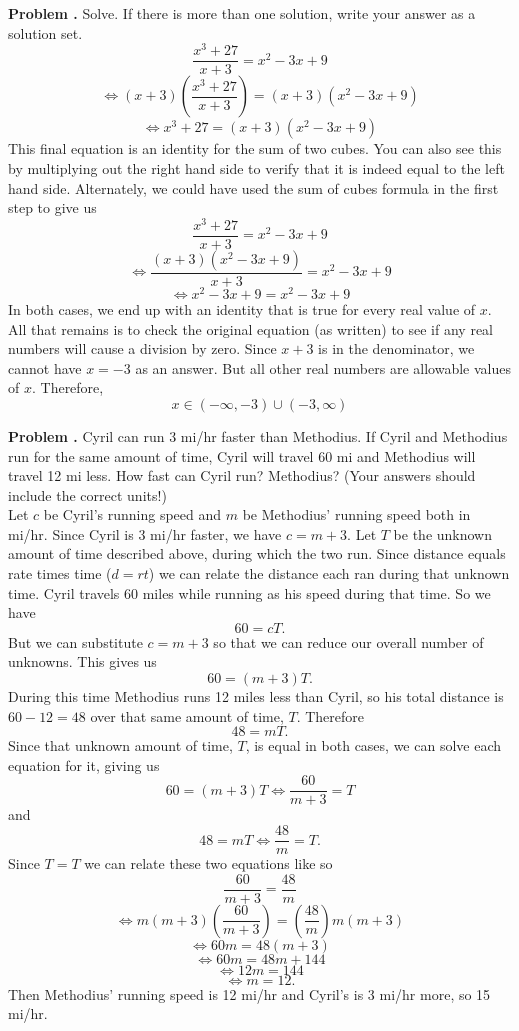 \documentclass[11pt,letterpaper]{article}
\newcounter{problem}
\newcommand{\problem}{
	\stepcounter{problem}%
	\noindent \textbf{ Problem \theproblem. }        
}
\begin{document}
\vspace{.5cm}


\problem Solve. If there is more than one solution, write your answer as a solution set.
 $$\frac{x^3 + 27}{x + 3} = x^2 - 3x + 9$$
 $$ \iff (x+3) \left(\frac{x^3 + 27}{x + 3}\right) = (x+3)(x^2 - 3x + 9) $$
 $$ \iff x^3 + 27 = (x+3)(x^2 - 3x + 9) $$
 This final equation is an identity for the sum of two cubes. You can also see this by multiplying out the right hand side to verify that it is indeed equal to the left hand side. Alternately, we could have used the sum of cubes formula in the first step to give us
 $$\frac{x^3 + 27}{x + 3} = x^2 - 3x + 9$$
 $$ \iff \frac{(x+3)(x^2 - 3x + 9)}{x + 3} = x^2 - 3x + 9 $$
 $$ \iff x^2 - 3x + 9 = x^2 - 3x + 9$$
In both cases, we end up with an identity that is true for every real value of $x$. All that remains is to check the original equation (as written) to see if any real numbers will cause a division by zero. Since $x+3$ is in the denominator, we cannot have $x = -3$ as an answer. But all other real numbers are allowable values of $x$. Therefore, 
$$ x \in ( -\infty, -3) \cup (-3, \infty)$$
\vspace{.5cm}


\problem Cyril can run 3 mi/hr faster than Methodius. If Cyril and Methodius run for the same amount of time, Cyril will travel 60 mi and Methodius will travel 12 mi less. How fast can Cyril run? Methodius? (Your answers should include the correct units!) 
\\

Let $c$ be Cyril's running speed and $m$ be Methodius' running speed both in mi/hr. Since Cyril is 3 mi/hr faster, we have $c = m+3$. Let $T$ be the unknown amount of time described above, during which the two run. Since distance equals rate times time ($ d = rt $) we can relate the distance each ran during that unknown time. Cyril travels 60 miles while running as his speed during that time. So we have
$$ 60 = cT.$$
But we can substitute $c = m+3$ so that we can reduce our overall number of unknowns. This gives us
$$ 60 = (m+3)T. $$
During this time Methodius runs 12 miles less than Cyril, so his total distance is $60 - 12 = 48$ over that same amount of time, $T$. Therefore
$$ 48 = mT.$$
Since that unknown amount of time, $T$, is equal in both cases, we can solve each equation for it, giving us
$$ 60 = (m+3)T \iff \frac{60}{m+3} = T $$
and
$$ 48 = mT \iff \frac{48}{m} = T.$$
Since $T =T$ we can relate these two equations like so
$$ \frac{60}{m+3} = \frac{48}{m} $$
$$ \iff m(m+3)\left(\frac{60}{m+3}\right) = \left(\frac{48}{m}\right) m(m+3)$$
$$ \iff 60m = 48(m+3) $$
$$ \iff 60m = 48m + 144 $$
$$ \iff 12m = 144$$
$$ \iff m = 12.$$
Then Methodius' running speed is 12 mi/hr and Cyril's is 3 mi/hr more, so 15 mi/hr.
\end{document}
